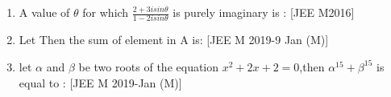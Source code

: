 \documentclass[journal,12pt,twocolumn,article]{IEEEtran}
\theoremstyle{remark}
\begin{document}
\begin{enumerate}[start = 14]
\item A value of $\theta$ for which $\frac{2+3isin\theta}{1-2isin\theta}$ is purely imaginary is :      
\hfill{[JEE M2016]}

\begin{enumerate}
\end{enumerate}                                     

\item Let   Then the sum of element in A is:
\hfill{[JEE M 2019-9 Jan (M)]}
\begin{enumerate}
\end{enumerate}

\item let $\alpha$ and $\beta$ be two roots of the equation $x^2+2x+2=0$,then $\alpha^{15}+\beta^{15}$ is equal to :                                       
\hfill{[JEE M 2019-Jan (M)]}                       
\begin{enumerate}                                   
\end{enumerate}


\end{enumerate}
\end{document}
